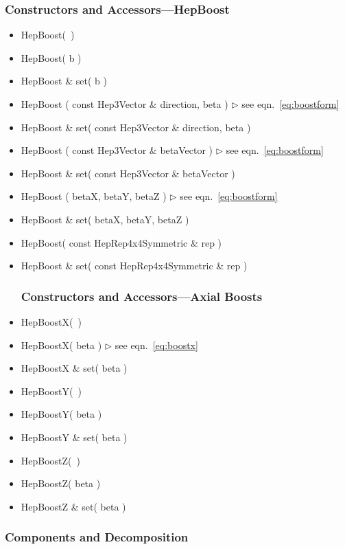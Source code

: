 \documentclass[twoside,12pt]{article}
\newcommand {\see}[1] {\hfill$\triangleright$ see eqn.~#1}
\newenvironment{shortlist}{%
\begin{itemize}
\setlength{\itemsep}{0pt}
\setlength{\parskip}{0pt}
}{%
\end{itemize}
}
\begin{document}
\subsubsection{Constructors and Accessors---HepBoost}

\begin{shortlist}
  \item HepBoost(~)
  \item HepBoost( b )
  \item HepBoost \& set( b )
  \item HepBoost ( const Hep3Vector \& direction, beta ) 
							\see{\ref{eq:boostform}}
  \item HepBoost \& set( const Hep3Vector \& direction, beta )

  \item HepBoost ( const Hep3Vector \& betaVector ) 
							\see{\ref{eq:boostform}}
  \item HepBoost \& set( const Hep3Vector \& betaVector )
  \item HepBoost ( betaX, betaY, betaZ ) 		\see{\ref{eq:boostform}}
  \item HepBoost \& set( betaX, betaY, betaZ ) 
  \item HepBoost( const HepRep4x4Symmetric \& rep )
  \item HepBoost \& set( const HepRep4x4Symmetric \& rep )

\subsubsection{Constructors and Accessors---Axial Boosts}
  \item HepBoostX(~)
  \item HepBoostX( beta )		\see{\ref{eq:boostx}}
  \item HepBoostX \& set( beta )	
  \item HepBoostY(~)
  \item HepBoostY( beta )		
  \item HepBoostY \& set( beta )	
  \item HepBoostZ(~)
  \item HepBoostZ( beta )		
  \item HepBoostZ \& set( beta )	
\end{shortlist}

\subsubsection{Components and Decomposition} 
\end{document}
